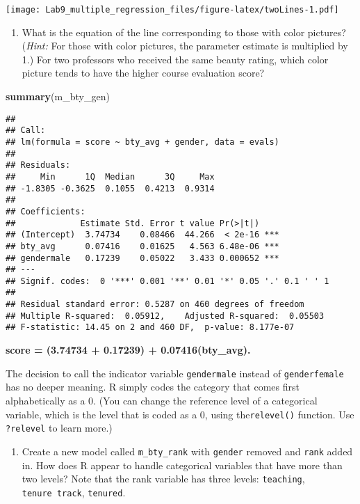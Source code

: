 \documentclass[
]{article}
\newenvironment{Shaded}{\begin{snugshade}}{\end{snugshade}}
\newcommand{\FunctionTok}[1]{\textcolor[rgb]{0.13,0.29,0.53}{\textbf{#1}}}
\newcommand{\NormalTok}[1]{#1}
\providecommand{\tightlist}{%
  \setlength{\itemsep}{0pt}\setlength{\parskip}{0pt}}
\begin{document}
\texttt{[image: Lab9\_multiple\_regression\_files/figure-latex/twoLines-1.pdf]}

\begin{enumerate}
\def\labelenumi{\arabic{enumi}.}
\setcounter{enumi}{8}
\tightlist
\item
  What is the equation of the line corresponding to those with color
  pictures? (\emph{Hint:} For those with color pictures, the parameter
  estimate is multiplied by 1.) For two professors who received the same
  beauty rating, which color picture tends to have the higher course
  evaluation score?
\end{enumerate}

\begin{Shaded}
\begin{Highlighting}[]
\FunctionTok{summary}\NormalTok{(m\_bty\_gen)}
\end{Highlighting}
\end{Shaded}

\begin{verbatim}
## 
## Call:
## lm(formula = score ~ bty_avg + gender, data = evals)
## 
## Residuals:
##     Min      1Q  Median      3Q     Max 
## -1.8305 -0.3625  0.1055  0.4213  0.9314 
## 
## Coefficients:
##             Estimate Std. Error t value Pr(>|t|)    
## (Intercept)  3.74734    0.08466  44.266  < 2e-16 ***
## bty_avg      0.07416    0.01625   4.563 6.48e-06 ***
## gendermale   0.17239    0.05022   3.433 0.000652 ***
## ---
## Signif. codes:  0 '***' 0.001 '**' 0.01 '*' 0.05 '.' 0.1 ' ' 1
## 
## Residual standard error: 0.5287 on 460 degrees of freedom
## Multiple R-squared:  0.05912,    Adjusted R-squared:  0.05503 
## F-statistic: 14.45 on 2 and 460 DF,  p-value: 8.177e-07
\end{verbatim}

\textbf{score = (3.74734 + 0.17239) + 0.07416(bty\_avg).}

The decision to call the indicator variable \texttt{gendermale} instead
of \texttt{genderfemale} has no deeper meaning. R simply codes the
category that comes first alphabetically as a \(0\). (You can change the
reference level of a categorical variable, which is the level that is
coded as a 0, using the\texttt{relevel()} function. Use
\texttt{?relevel} to learn more.)

\begin{enumerate}
\def\labelenumi{\arabic{enumi}.}
\setcounter{enumi}{9}
\tightlist
\item
  Create a new model called \texttt{m\_bty\_rank} with \texttt{gender}
  removed and \texttt{rank} added in. How does R appear to handle
  categorical variables that have more than two levels? Note that the
  rank variable has three levels: \texttt{teaching},
  \texttt{tenure\ track}, \texttt{tenured}.
\end{enumerate}
\end{document}
